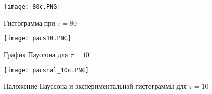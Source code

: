 \documentclass[a4paper]{article}
\begin{document}
\begin{figure}[t]
    \centering
    \texttt{[image: 80c.PNG]}
    \caption{Гистограмма при $\tau = 80$}
\end{figure}

\begin{figure}[t]
    \centering
    \texttt{[image: paus10.PNG]}
    \caption{График Пауссона для  $\tau = 10$}
\end{figure}

\begin{figure}[t]
    \centering
    \texttt{[image: pausnal\_10c.PNG]}
    \caption{Наложение Пауссона и экспериментальной гистограммы для  $\tau = 10$}
\end{figure}
\end{document}
